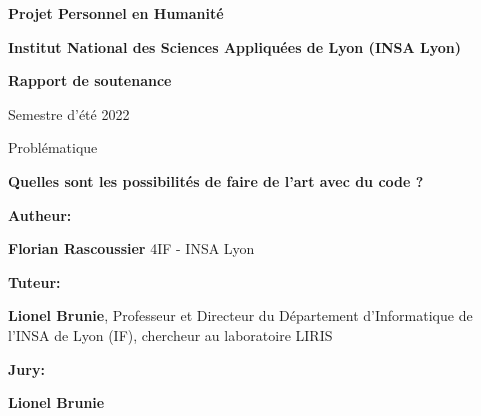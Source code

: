 \begin{titlepage}
    \begin{center}
        \vspace{1cm}
        \Large
        \textbf{Projet Personnel en Humanité}

        \vspace{0.5cm}
        \normalsize
        \textbf{Institut National des Sciences Appliquées de Lyon (INSA Lyon)}

        \vspace{2cm}
        \Huge
        \textbf{Rapport de soutenance}

        \normalsize
        Semestre d'été 2022

        \vspace{2cm}
        \Large
        Problématique

        \textbf{Quelles sont les possibilités de faire de l'art avec du code ?}

        \vfill

        \Large
        \textbf{Autheur:} \par
        \normalsize
        \textbf{Florian Rascoussier}
        4IF - INSA Lyon

        \Large
        \textbf{Tuteur:} \par
        \normalsize
        \textbf{Lionel Brunie}, Professeur et Directeur du Département d'Informatique de l'INSA de Lyon (IF), chercheur au laboratoire LIRIS

        \Large
        \textbf{Jury:} \par
        \normalsize
        \textbf{Lionel Brunie}
            
    \end{center}
\end{titlepage}